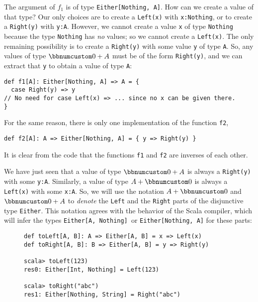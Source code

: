 The argument of $f_{1}$ is of type \lstinline!Either[Nothing, A]!.
How can we create a value of that type? Our only choices are to create
a \lstinline!Left(x)! with \lstinline!x:Nothing!, or to create a
\lstinline!Right(y)! with \lstinline!y:A!. However, we cannot create
a value \lstinline!x! of type \lstinline!Nothing! because the type
\lstinline!Nothing! has \emph{no} values; so we cannot create a \lstinline!Left(x)!.
The only remaining possibility is to create a \lstinline!Right(y)!
with some value \lstinline!y! of type \lstinline!A!. So, any values
of type $\bbnum 0+A$ must be of the form \lstinline!Right(y)!, and
we can extract that \lstinline!y! to obtain a value of type \lstinline!A!:
\begin{lstlisting}
def f1[A]: Either[Nothing, A] => A = {
  case Right(y) => y
// No need for case Left(x) => ... since no x can be given there.
}
\end{lstlisting}
For the same reason, there is only one implementation of the function
\lstinline!f2!,
\begin{lstlisting}
def f2[A]: A => Either[Nothing, A] = { y => Right(y) }
\end{lstlisting}
It is clear from the code that the functions \lstinline!f1! and \lstinline!f2!
are inverses of each other.

We have just seen that a value of type $\bbnum 0+A$ is always a \lstinline!Right(y)!
with some \lstinline!y:A!. Similarly, a value of type $A+\bbnum 0$
is always a \lstinline!Left(x)! with some \lstinline!x:A!. So, we
will use the notation $A+\bbnum 0$ and $\bbnum 0+A$ to \emph{denote}
the \lstinline!Left! and the \lstinline!Right! parts of the disjunctive
type \lstinline!Either!. This notation agrees with the behavior of
the Scala compiler, which will infer the types \lstinline!Either[A, Nothing] !or
\lstinline!Either[Nothing, A]! for these parts:

\begin{wrapfigure}{l}{0.53\columnwidth}%
\vspace{-0.5\baselineskip}
\begin{lstlisting}
def toLeft[A, B]: A => Either[A, B] = x => Left(x)
def toRight[A, B]: B => Either[A, B] = y => Right(y)

scala> toLeft(123)
res0: Either[Int, Nothing] = Left(123)

scala> toRight("abc")
res1: Either[Nothing, String] = Right("abc")
\end{lstlisting}

\vspace{-2\baselineskip}
\end{wrapfigure}%

